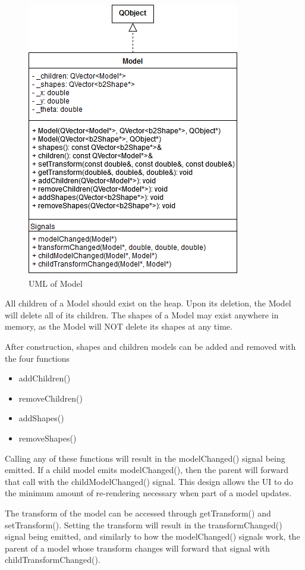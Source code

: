  \begin{figure}[h]
 	\begin{center}
 	\includegraphics[scale=0.5]{./images_design/uml/Model}
 	\caption{UML of Model\label{uml:model}}
 	\end{center}
 \end{figure}  
 
 All children of a Model should exist on the heap. Upon its deletion, the Model will delete all of its children. The shapes of a Model may exist anywhere in memory, as the Model will NOT delete its shapes at any time. 
 
After construction, shapes and children models can be added and removed with the four functions
 \begin{itemize}
 	\item addChildren()
 	\item removeChildren()
 	\item addShapes()
 	\item removeShapes()
 \end{itemize} 
 
 Calling any of these functions will result in the modelChanged() signal being emitted. If a child model emits modelChanged(), then the parent will forward that call with the childModelChanged() signal. This design allows the UI to do the minimum amount of re-rendering necessary when part of a model updates.
 
 The transform of the model can be accessed through getTransform() and setTransform(). Setting the transform will result in the transformChanged() signal being emitted, and similarly to how the modelChanged() signals work, the parent of a model whose transform changes will forward that signal with childTransformChanged().
 
